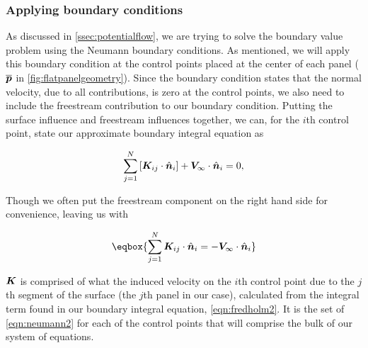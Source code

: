 \subsubsection{Applying boundary conditions}

As discussed in \cref{ssec:potentialflow}, we are trying to solve the boundary value problem using the Neumann boundary conditions.
%
As mentioned, we will apply this boundary condition at the control points placed at the center of each panel (\(\overline{\bm{p}}\) in \cref{fig:flatpanelgeometry}).
%
Since the boundary condition states that the normal velocity, due to all contributions, is zero at the control points, we also need to include the freestream contribution to our boundary condition.
%
Putting the surface influence and freestream influences together, we can, for the \(i\)th control point, state our approximate boundary integral equation as

\begin{equation}
    \label{eqn:neumanndiscrete}
    \sum_{j=1}^N \left[\bm{K}_{ij} \cdot \hat{\bm{n}}_i \right] + \bm{V}_\infty \cdot \hat{\bm{n}}_i = 0,
\end{equation}

\noindent Though we often put the freestream component on the right hand side for convenience, leaving us with

\begin{equation}
    \label{eqn:neumann2}
    \eqbox{
    \sum_{j=1}^N \vect{K}_{ij}\cdot \hat{\vect{n}}_i  = -\vect{V}_\infty \cdot \hat{\vect{n}}_i
}
\end{equation}

\where \(\bm{K}\) is comprised of what the induced velocity on the \(i\)th control point due to the \(j\)th segment of the surface (the \(j\)th panel in our case), calculated from the integral term found in our boundary integral equation, \cref{eqn:fredholm2}.%
%
It is the set of \cref{eqn:neumann2} for each of the control points that will comprise the bulk of our system of equations.

%
%


